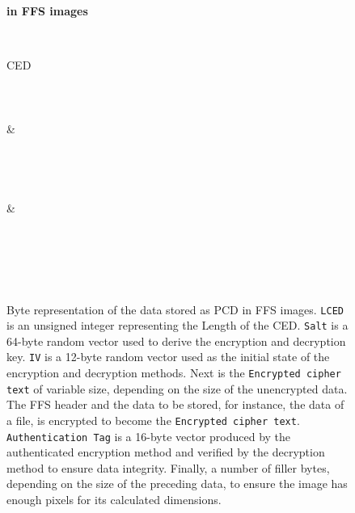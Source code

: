 \begin{figure}[!htb]
	\label{fig:app_bin_pixels}
	\centering
    \textbf{ in \gls{FFS} images}\par\medskip

	\begin{bytefield}[bitwidth=0.0312\textwidth]{32}
		 \\
		\begin{rightwordgroup}{CED}\\
			 \\
			 \\
			 \\
			 & \\
			 \\
			 \\
			\skippedwords \\
			 \\
			 & 
		\end{rightwordgroup} \\
		 \\
		\skippedwords \\
		 \\
	\end{bytefield}
	\caption[Byte representation of the data stored as \gls{PCD} in \gls{FFS} images]{Byte representation of the data stored as \gls{PCD} in \gls{FFS} images. \texttt{LCED} is an unsigned integer representing the Length of the \gls{CED}. \texttt{Salt} is a \mbox{64-byte} random vector used to derive the encryption and decryption key. \texttt{IV} is a \mbox{12-byte} random vector used as the initial state of the encryption and decryption methods. Next is the \texttt{Encrypted cipher text} of variable size, depending on the size of the unencrypted data. The \gls{FFS} header and the data to be stored, for instance, the data of a file, is encrypted to become the \texttt{Encrypted cipher text}. \texttt{Authentication Tag} is a \mbox{16-byte} vector produced by the authenticated encryption method and verified by the decryption method to ensure data integrity. Finally, a number of filler bytes, depending on the size of the preceding data, to ensure the image has enough pixels for its calculated dimensions.}
\end{figure}
\FloatBarrier